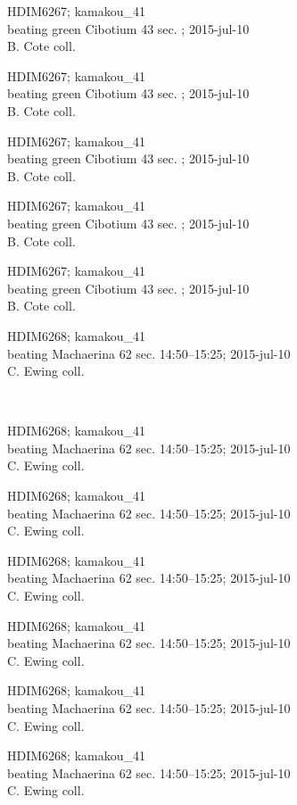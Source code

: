 \documentclass[2pt]{extarticle}
\begin{document}
\noindent
\parbox{0.16\textwidth}{\tiny \raggedright \rule[-0.3\baselineskip]{0pt}{10pt}HDIM6267; kamakou\_41\\ beating green Cibotium 43 sec. ; 2015-jul-10\\ B. Cote coll.}
\parbox{0.16\textwidth}{\tiny \raggedright \rule[-0.3\baselineskip]{0pt}{10pt}HDIM6267; kamakou\_41\\ beating green Cibotium 43 sec. ; 2015-jul-10\\ B. Cote coll.}
\parbox{0.16\textwidth}{\tiny \raggedright \rule[-0.3\baselineskip]{0pt}{10pt}HDIM6267; kamakou\_41\\ beating green Cibotium 43 sec. ; 2015-jul-10\\ B. Cote coll.}
\parbox{0.16\textwidth}{\tiny \raggedright \rule[-0.3\baselineskip]{0pt}{10pt}HDIM6267; kamakou\_41\\ beating green Cibotium 43 sec. ; 2015-jul-10\\ B. Cote coll.}
\parbox{0.16\textwidth}{\tiny \raggedright \rule[-0.3\baselineskip]{0pt}{10pt}HDIM6267; kamakou\_41\\ beating green Cibotium 43 sec. ; 2015-jul-10\\ B. Cote coll.}
\parbox{0.16\textwidth}{\tiny \raggedright \rule[-0.3\baselineskip]{0pt}{10pt}HDIM6268; kamakou\_41\\ beating Machaerina 62 sec. 14:50--15:25; 2015-jul-10\\ C. Ewing coll.} \\ 
\vspace{0.001in} 

\noindent
\parbox{0.16\textwidth}{\tiny \raggedright \rule[-0.3\baselineskip]{0pt}{10pt}HDIM6268; kamakou\_41\\ beating Machaerina 62 sec. 14:50--15:25; 2015-jul-10\\ C. Ewing coll.}
\parbox{0.16\textwidth}{\tiny \raggedright \rule[-0.3\baselineskip]{0pt}{10pt}HDIM6268; kamakou\_41\\ beating Machaerina 62 sec. 14:50--15:25; 2015-jul-10\\ C. Ewing coll.}
\parbox{0.16\textwidth}{\tiny \raggedright \rule[-0.3\baselineskip]{0pt}{10pt}HDIM6268; kamakou\_41\\ beating Machaerina 62 sec. 14:50--15:25; 2015-jul-10\\ C. Ewing coll.}
\parbox{0.16\textwidth}{\tiny \raggedright \rule[-0.3\baselineskip]{0pt}{10pt}HDIM6268; kamakou\_41\\ beating Machaerina 62 sec. 14:50--15:25; 2015-jul-10\\ C. Ewing coll.}
\parbox{0.16\textwidth}{\tiny \raggedright \rule[-0.3\baselineskip]{0pt}{10pt}HDIM6268; kamakou\_41\\ beating Machaerina 62 sec. 14:50--15:25; 2015-jul-10\\ C. Ewing coll.}
\parbox{0.16\textwidth}{\tiny \raggedright \rule[-0.3\baselineskip]{0pt}{10pt}HDIM6268; kamakou\_41\\ beating Machaerina 62 sec. 14:50--15:25; 2015-jul-10\\ C. Ewing coll.} \\ 
\vspace{0.001in} 
\end{document}
